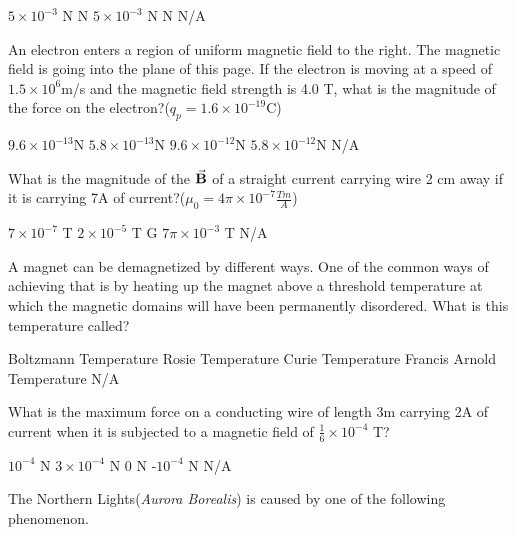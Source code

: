 \documentclass[12pt,addpoints]{exam}
\begin{document}
{{{\begin{questions}
\begin{oneparchoices}
				 		\choice $5\times10^{-3}$ N
				 		\choice 0 N
				 		\choice $5\times10^{-3}$ N
				 		\choice 1 N
				 		\choice N/A
				 	\end{oneparchoices}
			 		\question An electron enters a region of uniform magnetic field to the right. The magnetic field is going into the plane of this page. If the electron is moving at a speed of $1.5\times10^6$m/s and the magnetic field strength is 4.0 T, what is the magnitude of the force on the electron?($q_p=1.6\times10^{-19}$C)\\ \begin{oneparchoices}
			 			\choice $9.6\times10^{-13}$N
			 			\choice $5.8\times10^{-13}$N
			 			\choice $9.6\times10^{-12}$N
			 			\choice $5.8\times10^{-12}$N
			 			\choice N/A
			 		\end{oneparchoices}
		 			\question What is the magnitude of the $\vec{\bf B}$ of a straight current carrying wire 2 cm away if it is carrying 7A of current?($\mu_0=4\pi\times10^{-7}\frac{Tm}{A}$)\\ \begin{oneparchoices}
		 				\choice $7\times10^{-7}$ T
		 				\choice $2\times10^{-5}$ T
		 				.7 G
		 				\choice $7\pi\times10^{-3}$ T
		 				\choice N/A
		 			\end{oneparchoices}
	 				\question A magnet can be demagnetized by different ways. One of the common ways of achieving that is by heating up the magnet above a threshold temperature at which the magnetic domains will have been permanently disordered. What is this temperature called? \\ 
	 				\begin{oneparchoices}
	 					\choice Boltzmann Temperature
	 					\choice Rosie Temperature
	 					\choice Curie Temperature
	 					\choice Francis Arnold Temperature
	 					\choice N/A
	 				\end{oneparchoices}
 					\question What is the maximum force on a conducting wire of length 3m carrying 2A of current when it is subjected to a magnetic field of $\frac{1}{6}\times10^{-4}$ T?\\ \begin{oneparchoices}
 						\choice $10^{-4}$ N
 						\choice $3\times10^{-4}$ N
 						\choice $0$ N
 						\choice -$10^{-4}$ N
 						\choice N/A
 					\end{oneparchoices}
 				    \question The Northern Lights(\textit{Aurora Borealis}) is caused by one of the following phenomenon.\\ \begin{oneparchoices}

\end{oneparchoices}
\end{questions}}}}
\end{document}
